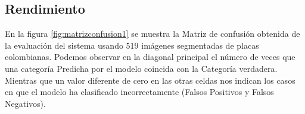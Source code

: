\subsection*{Rendimiento}


En la figura \ref{fig:matrizconfusion1} se muestra la Matriz de confusión obtenida de la evaluación del sistema usando 519 imágenes segmentadas de placas colombianas. Podemos observar en la diagonal principal el número de veces que una categoría Predicha por el modelo coincida con la Categoría verdadera. Mientras que un valor diferente de cero en las otras celdas nos indican los casos en que el modelo ha clasificado incorrectamente (Falsos Positivos y Falsos Negativos).

